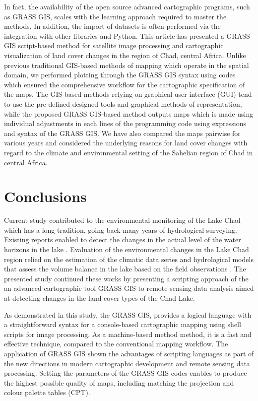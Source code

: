 \documentclass[geosciences,article,submit,pdftex,moreauthors]{Definitions/mdpi}
\begin{document}
In fact, the availability of the open source advanced cartographic programs, such as GRASS GIS, scales with the learning approach required to master the methods. In addition, the import of datasets is often performed via the integration with other libraries and Python. This article has presented a GRASS GIS script-based method for satellite image processing and cartographic visualization of land cover changes in the region of Chad, central Africa. Unlike previous traditional GIS-based methods of mapping which operate in the spatial domain, we performed plotting through the GRASS GIS syntax using codes which ensured the comprehensive workflow for the cartographic specification of the maps. The GIS-based methods relying on graphical user interface (GUI) tend to use the pre-defined designed tools and graphical methods of representation, while the proposed GRASS GIS-based method outputs maps which is made using individual adjustments in each lines of the programming code using expressions and syntax of the GRASS GIS. We have also compared the maps pairwise for various years and considered the underlying reasons for land cover changes with regard to the climate and environmental setting of the Sahelian region of Chad in central Africa.

\section{Conclusions}

Current study contributed to the environmental monitoring of the Lake Chad which has a long tradition, going back many years of hydrological surveying. Existing reports enabled to detect the changes in the actual level of the water horizons in the lake \cite{Tilho,LHuillier,Cabot,Tubiana,01440}. Evaluation of the environmental changes in the Lake Chad region relied on the estimation of the climatic data series \cite{Riou} and hydrological models that assess the volume balance in the lake based on the field observations \cite{bader2011modele}. The presented study continued these works by presenting a scripting approach of the an advanced cartographic tool GRASS GIS to remote sensing data analysis aimed at detecting changes in the land cover types of the Chad Lake. 

As demonstrated in this study, the GRASS GIS, provides a logical language with a straightforward syntax for a console-based cartographic mapping using shell scripts for image processing. As a machine-based method method, it is a fast and effective technique, compared to the conventional mapping workflow. The application of GRASS GIS shown the advantages of scripting languages as part of the new directions in modern cartographic development and remote sensing data processing. Setting the parameters of the GRASS GIS codes enables to produce the highest possible quality of maps, including matching the projection and colour palette tables (CPT).
\end{document}
